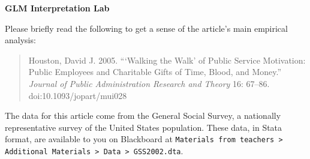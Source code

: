 \documentclass[a4paper,12pt]{article}
\begin{document}
\begin{center}
\textbf{GLM Interpretation Lab}
\end{center}

\noindent Please briefly read the following to get a sense of the article's main empirical analysis:

\begin{quote}
Houston, David J. 2005. ```Walking the Walk' of Public Service Motivation: Public Employees and Charitable Gifts of Time, Blood, and Money.'' {\em Journal of Public Administration Research and Theory} 16: 67--86. doi:10.1093/jopart/mui028
\end{quote}

\noindent The data for this article come from the General Social Survey, a nationally representative survey of the United States population. These data, in Stata format, are available to you on Blackboard at  \texttt{Materials from 	teachers > Additional Materials > Data > GSS2002.dta}.
\end{document}
